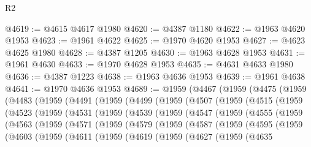 \begin{lexlean}{R2}
\begin{coremodule}
@4619 := @4615 @4617 @1980
@4620 := @4387 @1180
@4622 := @1963 @4620 @1953
@4623 := @1961 @4622
@4625 := @1970 @4620 @1953
@4627 := @4623 @4625 @1980
@4628 := @4387 @1205
@4630 := @1963 @4628 @1953
@4631 := @1961 @4630
@4633 := @1970 @4628 @1953
@4635 := @4631 @4633 @1980
@4636 := @4387 @1223
@4638 := @1963 @4636 @1953
@4639 := @1961 @4638
@4641 := @1970 @4636 @1953
@4689 := @1959
    (@4467
      (@1959
        (@4475
          (@1959
            (@4483
              (@1959
                (@4491
                  (@1959
                    (@4499
                      (@1959
                        (@4507
                          (@1959
                            (@4515
                              (@1959
                                (@4523
                                  (@1959
                                    (@4531
                                      (@1959
                                        (@4539
                                          (@1959
                                            (@4547
                                              (@1959
                                                (@4555
                                                  (@1959
                                                    (@4563
                                                      (@1959
                                                        (@4571
                                                          (@1959
                                                            (@4579
                                                              (@1959
                                                                (@4587
                                                                  (@1959
                                                                    (@4595
                                                                      (@1959
                                                                        (@4603
                                                                          (@1959
                                                                            (@4611
                                                                              (@1959
                                                                                (@4619
                                                                                  (@1959
                                                                                    (@4627
                                                                                      (@1959
                                                                                        (@4635

\end{coremodule}
\end{lexlean}
